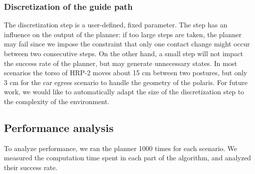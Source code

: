 
\subsubsection{Discretization of the guide path} \label{sec:disc}
The discretization step is a user-defined, fixed parameter. The step
has an influence on the output of the planner: if too large steps are taken,
the planner may fail since we impose the constraint that only one contact change might occur
between two consecutive steps. On the other hand, a small step will not impact the success rate of the planner, 
but may generate unnecessary states. In most scenarios the torso of HRP-2 moves about 15 cm between two postures, but only 3 cm
for the car egress scenario to handle the geometry of the polaris.
For future work, we would like to automatically adapt the size of the discretization step to the complexity of the environment.

\subsection{Performance analysis} \label{sec:perf}
To analyze performance, we ran the planner 1000 times for each scenario.
We measured the computation time spent in each part of the algorithm, and analyzed their success rate.


